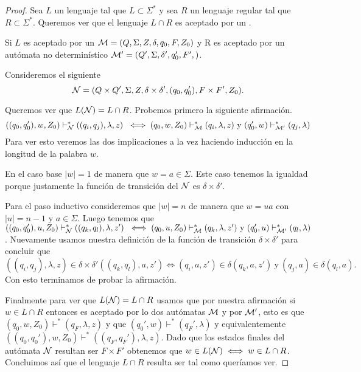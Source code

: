 \documentclass[tesis.tex]{subfiles}
\begin{document}
\begin{proof}
	Sea $L$ un lenguaje \ic tal que $L \subset \Sigma^*$ y sea $R$ un lenguaje regular tal que $R \subset \Sigma^*$. 
	Queremos ver que el lenguaje $L \cap R$ es aceptado por un \APND.
	
	Si $L$ es aceptado por un \APND ${\cal M } = (Q, \Sigma, Z, \delta, q_0, F, Z_0)$ y R es aceptado por un autómata no determinístico ${\cal M' } = (Q', \Sigma, \delta', q_0', F',)$.
	
	Consideremos el siguiente \APND
	\[
		{\cal N } = (Q \times Q', \Sigma, Z, \delta \times \delta', (q_0,q_0'), F \times F', Z_0).
	\]	
	
	Queremos ver que $L({\cal N}) = L \cap R $.	
	Probemos primero la siguiente afirmación.
	\[
	((q_0,q_0'), w, Z_0) \vdash^*_{\cal N}  ((q_i,q_j), \lambda, z) \ \iff (q_0, w, Z_0) \vdash^*_{\cal M}  (q_i, \lambda, z) \ \text{y} \ (q_0', w) \vdash^*_{\cal M'} (q_j, \lambda)  	
	\]
	Para ver esto veremos las dos implicaciones a la vez haciendo inducción en la longitud de la palabra $w$.
	
	En el caso base $|w| = 1$ de manera que $w = a \in \Sigma$.
	Este caso tenemos la igualdad porque justamente la función de transición del \APND $\cal N$ es $\delta \times \delta'$.
	
	Para el paso inductivo consideremos que $|w|=n$ de manera que $w=ua$ con $|u|=n-1$ y $a \in \Sigma$.
	Luego tenemos que $((q_0,q_0'), u, Z_0) \vdash^*_{\cal N}  ((q_k,q_l), \lambda, z') \ \iff (q_0, u, Z_0) \vdash^*_{\cal M}  (q_k, \lambda, z') \ \text{y} \ (q_0', u) \vdash^*_{\cal M'} (q_l, \lambda)$.
	Nuevamente usamos nuestra definición de la función de transición $\delta \times \delta'$ para concluir que
	\[ 
	((q_i,q_j),\lambda, z) \in \delta \times \delta'((q_k,q_l), a, z') \iff  (q_i, a, z') \in \delta(q_k, a, z') \ \text{y} \ (q_j, a) \in \delta(q_l, a).
	\]	
	Con esto terminamos de probar la afirmación.
	
	Finalmente para ver que $L({\cal N})  =  L \cap R$ usamos que por nuestra afirmación si $w \in L \cap R$ entonces es aceptado por lo dos autómatas $\cal M$ y por $\cal M'$, esto es que $(q_0, w, Z_0) \vdash^* (q_F, \lambda, z)$ y que $(q_0', w) \vdash^* (q_F', \lambda)$ y equivalentemente $((q_0,q_0'),w,Z_0) \vdash^* ((q_F, q_F'),\lambda, z)$. 
	Dado que los estados finales del autómata $\cal N$ resultan ser $F \times F'$ obtenemos que $w \in L({\cal N}) \iff w \in L \cap R$.
	Concluimos así que el lenguaje $L \cap R$ resulta ser \ic tal como queríamos ver.		
\end{proof}
\end{document}
